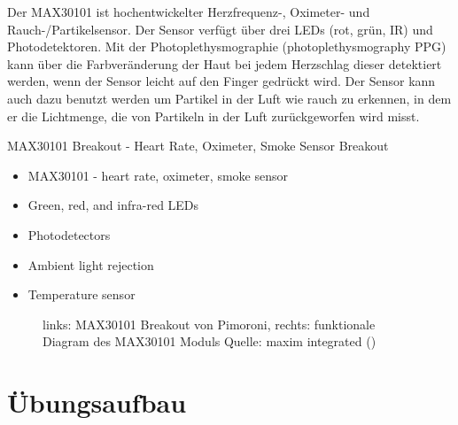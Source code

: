 \documentclass[
  11pt,
  a4paperpaper,
  oneside, openany  ,captions=tableheading
]{scrbook}
\providecommand{\tightlist}{%
  \setlength{\itemsep}{0pt}\setlength{\parskip}{0pt}}
\theoremstyle{definition}
\theoremstyle{remark}
\begin{document}
Der MAX30101 ist hochentwickelter Herzfrequenz-, Oximeter- und
Rauch-/Partikelsensor. Der Sensor verfügt über drei LEDs (rot, grün, IR)
und Photodetektoren. Mit der Photoplethysmographie (photoplethysmography
PPG) kann über die Farbveränderung der Haut bei jedem Herzschlag dieser
detektiert werden, wenn der Sensor leicht auf den Finger gedrückt wird.
Der Sensor kann auch dazu benutzt werden um Partikel in der Luft wie
rauch zu erkennen, in dem er die Lichtmenge, die von Partikeln in der
Luft zurückgeworfen wird misst.

MAX30101 Breakout - Heart Rate, Oximeter, Smoke Sensor Breakout

\begin{itemize}
\tightlist
\item
  MAX30101 - heart rate, oximeter, smoke sensor
\item
  Green, red, and infra-red LEDs
\item
  Photodetectors
\item
  Ambient light rejection
\item
  Temperature sensor
\end{itemize}

\begin{figure}


\caption{\label{fig-MAX30101}links: MAX30101 Breakout von Pimoroni,
rechts: funktionale Diagram des MAX30101 Moduls Quelle: maxim integrated
()}

\end{figure}%

\section{Übungsaufbau}\label{uxfcbungsaufbau-5}
\end{document}
